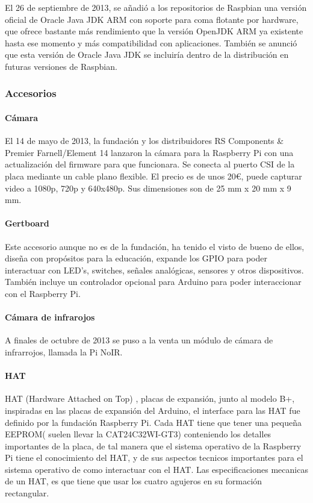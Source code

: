 \documentclass[a4paper,11pt,oneside]{book}
\begin{document}
El 26 de septiembre de 2013, se añadió a los repositorios de Raspbian una versión oficial de Oracle Java JDK ARM con soporte para coma flotante por hardware, que ofrece bastante más rendimiento que la versión OpenJDK ARM ya existente hasta ese momento y más compatibilidad con aplicaciones. También se anunció que esta versión de Oracle Java JDK se incluiría dentro de la distribución en futuras versiones de Raspbian.


\subsubsection{Accesorios}
\paragraph{Cámara}

 El 14 de mayo de 2013, la fundación y los distribuidores RS Components \& Premier Farnell/Element 14 lanzaron la cámara para la Raspberry Pi con una actualización del firmware para que funcionara. 
Se conecta al puerto CSI de la placa mediante un cable plano flexible. El precio es de unos 20\euro{}, puede capturar video a 1080p, 720p y 640x480p. Sus dimensiones son de 25 mm x 20 mm x 9 mm.
\paragraph{Gertboard}

Este accesorio aunque no es de la fundación, ha tenido el visto de bueno de ellos, diseña con propósitos para la educación, expande los GPIO para poder interactuar con LED's, switches, señales analógicas, sensores y otros dispositivos. También incluye un controlador opcional para Arduino para poder interaccionar con el Raspberry Pi.
 
\paragraph{Cámara de infrarojos}
A finales de octubre de 2013 se puso a la venta un módulo de cámara de infrarrojos, llamada la Pi NoIR.

\paragraph{HAT}

HAT (Hardware Attached on Top) , placas de expansión, junto al modelo B+, inspiradas en las placas de expansión del Arduino, el interface para las HAT fue definido por la fundación Raspberry Pi. Cada HAT tiene que tener una pequeña EEPROM( suelen llevar la CAT24C32WI-GT3) conteniendo los detalles importantes de la placa, de tal manera que el sistema operativo de la Raspberry Pi tiene el conocimiento del HAT, y de sus aspectos tecnicos importantes para el sistema operativo de como interactuar con el HAT.
Las especificaciones mecanicas de un HAT, es que tiene que usar los cuatro agujeros en su formación rectangular.
\end{document}
